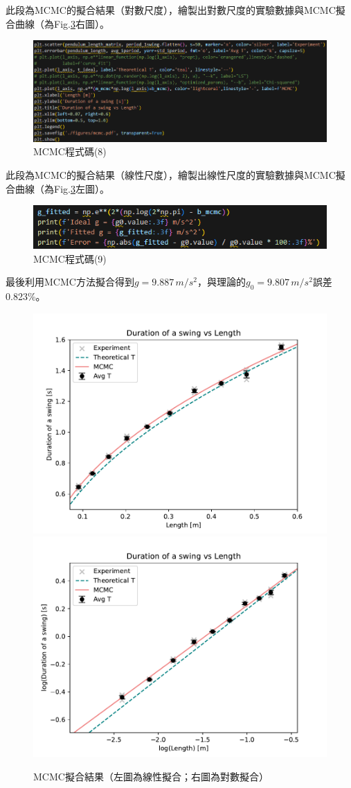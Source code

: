 \documentclass[12pt,a4paper]{article}
\begin{document}
\begin{CJK}{UTF8}{bkai}
\indent 此段為MCMC的擬合結果（對數尺度），繪製出對數尺度的實驗數據與MCMC擬合曲線（為Fig.\ref{MCMC}右圖）。

\clearpage

\begin{figure}[h]
    \centering
    \includegraphics[width=1\linewidth]{MCMC8.png}
    \caption{MCMC程式碼(8)}
    \label{fig:MCMC8}
\end{figure}

\indent 此段為MCMC的擬合結果（線性尺度），繪製出線性尺度的實驗數據與MCMC擬合曲線（為Fig.\ref{MCMC}左圖）。

\begin{figure}[h]
    \centering
    \includegraphics[width=1\linewidth]{MCMC9.png}
    \caption{MCMC程式碼(9)}
    \label{fig:MCMC9}
\end{figure}

最後利用MCMC方法擬合得到$g=9.887\,m/s^2$，與理論的$g_0=9.807\,m/s^2$誤差0.823\%。


\begin{figure}[h]
    \centering
    \includegraphics[width=0.45\linewidth]{mcmc.pdf}
    \includegraphics[width=0.45\linewidth]{mcmc_log.pdf}
    \caption{MCMC擬合結果（左圖為線性擬合；右圖為對數擬合）}
    \label{MCMC}
\end{figure}


\end{CJK}
\end{document}

